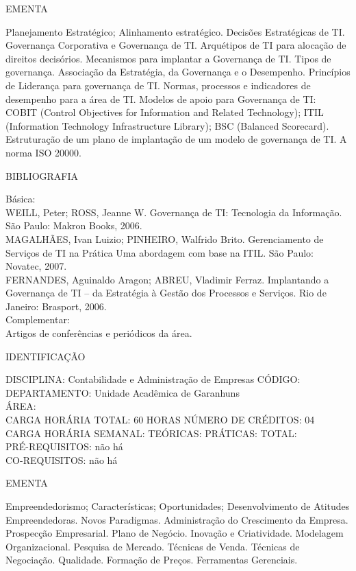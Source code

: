 \documentclass[
	12pt,				%
	openright,			%
  oneside,     %
	a4paper,			%
	chapter=TITLE,		%
	english,			%
	french,				%
	spanish,			%
	brazil				%
	]{abntex2}
\begin{document}
\begin{apendicesenv}
EMENTA 

Planejamento Estratégico; Alinhamento estratégico. Decisões Estratégicas
de TI. Governança Corporativa e Governança de TI. Arquétipos de TI para
alocação de direitos decisórios. Mecanismos para implantar a Governança
de TI. Tipos de governança. Associação da Estratégia, da Governança e o
Desempenho. Princípios de Liderança para governança de TI. Normas,
processos e indicadores de desempenho para a área de TI. Modelos de
apoio para Governança de TI: COBIT (Control Objectives for Information
and Related Technology); ITIL (Information Technology Infrastructure
Library); BSC (Balanced Scorecard). Estruturação de um plano de
implantação de um modelo de governança de TI. A norma ISO 20000.

BIBLIOGRAFIA 

Básica:\\
WEILL, Peter; ROSS, Jeanne W. Governança de TI: Tecnologia da
Informação. São Paulo: Makron Books, 2006.\\
MAGALHÃES, Ivan Luizio; PINHEIRO, Walfrido Brito. Gerenciamento de
Serviços de TI na Prática  Uma abordagem com base na ITIL. São
Paulo: Novatec, 2007.\\
FERNANDES, Aguinaldo Aragon; ABREU, Vladimir Ferraz. Implantando a
Governança de TI -- da Estratégia à Gestão dos Processos e Serviços.
Rio de Janeiro: Brasport, 2006.\\
Complementar:\\
Artigos de conferências e periódicos da área.

\newpage IDENTIFICAÇÃO

DISCIPLINA: Contabilidade e Administração de Empresas CÓDIGO:\\ 
DEPARTAMENTO: Unidade Acadêmica de Garanhuns\\
ÁREA: \\
CARGA HORÁRIA TOTAL: 60 HORAS NÚMERO DE CRÉDITOS: 04\\
CARGA HORÁRIA SEMANAL: TEÓRICAS: PRÁTICAS: TOTAL: \\
PRÉ-REQUISITOS: não há\\
CO-REQUISITOS: não há

EMENTA 

Empreendedorismo; Características; Oportunidades; Desenvolvimento de
Atitudes Empreendedoras. Novos Paradigmas. Administração do Crescimento
da Empresa. Prospecção Empresarial. Plano de Negócio. Inovação e
Criatividade. Modelagem Organizacional. Pesquisa de Mercado. Técnicas
de Venda. Técnicas de Negociação. Qualidade. Formação de Preços.
Ferramentas Gerenciais.


\end{apendicesenv}
\end{document}
